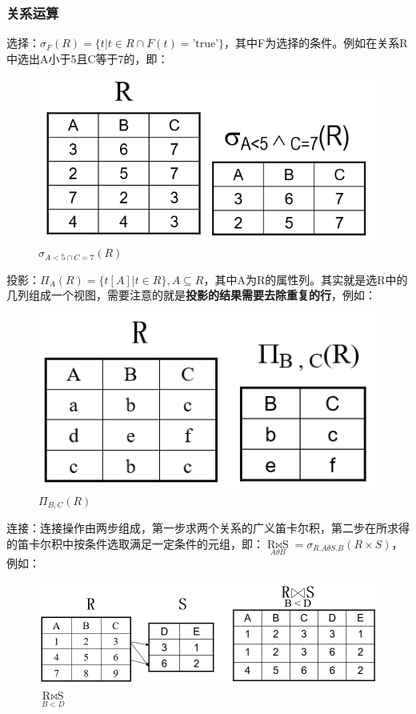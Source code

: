 \documentclass[main.tex]{subfiles}
\begin{document}
\subsubsection{关系运算}
选择：$ \sigma_F(R)=\{t | t \in R \cap F(t) = \text{'true'}\} $，其中F为选择的条件。例如在关系R中选出A小于5且C等于7的，即：\\
\begin{figure}[H]
    \centering
    \includegraphics[scale=0.25]{./images/0026.png}
    \caption{$ \sigma_{A<5 \cap C=7}(R) $}
\end{figure}
投影：$ \Pi_A(R)=\{ t[A] | t \in R \}, A \subseteq R $，其中A为R的属性列。其实就是选R中的几列组成一个视图，需要注意的就是{\bfseries 投影的结果需要去除重复的行}，例如：\\
\begin{figure}[H]
    \centering
    \includegraphics[scale=0.25]{./images/0027.png}
    \caption{$ \Pi_{B,C}(R) $}
\end{figure}
连接：连接操作由两步组成，第一步求两个关系的广义笛卡尔积，第二步在所求得的笛卡尔积中按条件选取满足一定条件的元组，即：$ \mathop{R \Join S}\limits_{A \theta B}=\sigma_{R.A \theta S.B}(R \times S) $，例如：\\
\begin{figure}[H]
    \centering
    \includegraphics[scale=0.25]{./images/0028.png}
    \caption{$ \mathop{R \Join S}\limits_{B<D} $}
\end{figure}
\end{document}
